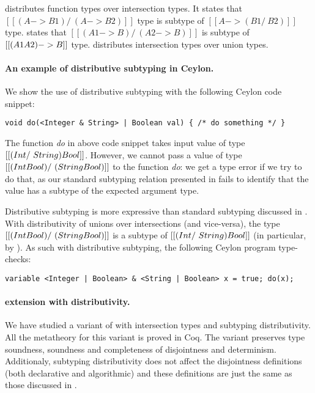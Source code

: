  distributes function types over intersection types.
It states that $[[(A -> B1) /\ (A -> B2)]]$ type is subtype of
$[[A -> (B1 /\ B2)]]$ type.
 states that $[[(A1 -> B) /\ (A2 -> B)]]$ is subtype of
$[[(A1 \/ A2) -> B]]$ type.
 distributes intersection types over union types.

\paragraph{An example of distributive subtyping in Ceylon.}
We show the use of distributive subtyping with the following Ceylon code snippet:

\begin{lstlisting}
void do(<Integer & String> | Boolean val) { /* do something */ }
\end{lstlisting}

\noindent
The function \emph{do} in above code snippet takes input value of type $[[(Int
/\ String) \/ Bool]]$. However, we cannot pass a value of type $[[(Int \/ Bool)
/\ (String \/ Bool)]]$ to the function \emph{do}: we get a type error if we try
to do that, as our standard subtyping relation presented in
 fails to identify that the value has a subtype of the
expected argument type.

Distributive subtyping is more expressive than standard subtyping discussed in
. With distributivity of unions over intersections
(and vice-versa), the type $[[(Int \/ Bool) /\ (String \/ Bool)]]$ is a subtype
of $[[(Int /\ String) \/ Bool]]$ (in particular, by ). As such
with distributive subtyping, the following Ceylon program type-checks:

\begin{lstlisting}
variable <Integer | Boolean> & <String | Boolean> x = true; do(x);
\end{lstlisting}


\paragraph{\name extension with distributivity.}
We have studied a variant of \name with intersection types and subtyping distributivity.
All the metatheory for this variant is proved in Coq. The variant preserves
type soundness, soundness and completeness of disjointness and determinism.
Additionaly, subtyping distributivity
does not affect the disjointness definitions (both declarative and algorithmic)
and these definitions are just the same as those discussed in .

